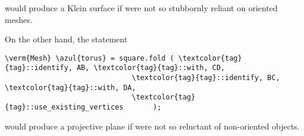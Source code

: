 \noindent would produce a Klein surface if {\maniFEM} were not so stubbornly reliant on
oriented meshes.

\vfill\eject
On the other hand, the statement

\begin{Verbatim}[commandchars=\\\{\},formatcom=\small\tt,
   baselinestretch=0.94,framesep=2mm                     ]
   \verm{Mesh} \azul{torus} = square.fold ( \textcolor{tag}{tag}::identify, AB, \textcolor{tag}{tag}::with, CD,
                              \textcolor{tag}{tag}::identify, BC, \textcolor{tag}{tag}::with, DA,
                              \textcolor{tag}{tag}::use_existing_vertices       );
\end{Verbatim}

\noindent would produce a projective plane if {\maniFEM} were not so reluctant of
non-oriented objects.

